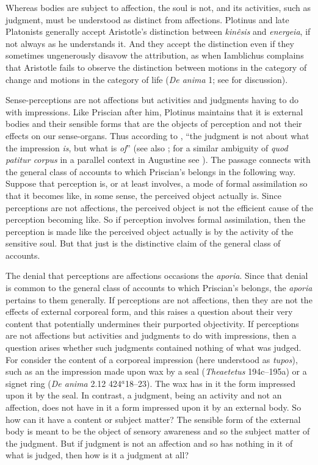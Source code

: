 \documentclass[12pt]{article}
\begin{document}
Whereas bodies are subject to affection, the soul is not, and its activities, such as judgment, must be understood as distinct from affections. Plotinus and late Platonists generally accept Aristotle's distinction between \emph{kinêsis} and \emph{energeia}, if not always as he understands it. And they accept the distinction even if they sometimes ungenerously disavow the attribution, as when Iamblichus complains that Aristotle fails to observe the distinction between motions in the category of change and motions in the category of life (\emph{De anima} 1; see \citealt[76--77]{Finamore:2002yf} for discussion). 

Sense-perceptions are not affections but activities and judgments having to do with impressions. Like Priscian after him, Plotinus maintains that it is external bodies and their sensible forms that are the objects of perception and not their effects on our sense-organs. Thus according to \citet[73]{Fleet:1995gf}, ``the judgment is not about what the impression \emph{is}, but what is \emph{of}'' (see also \citealt[75 n.28]{Emilsson:1988uq}; for a similar ambiguity of \emph{quod patitur corpus} in a parallel context in Augustine see \citealt{Brittain:2002hl}). The passage connects with the general class of accounts to which Priscian's belongs in the following way. Suppose that perception is, or at least involves, a mode of formal assimilation so that it becomes like, in some sense, the perceived object actually is. Since perceptions are not affections, the perceived object is not the efficient cause of the perception becoming like. So if perception involves formal assimilation, then the perception is made like the perceived object actually is by the activity of the sensitive soul. But that just is the distinctive claim of the general class of accounts.

The denial that perceptions are affections occasions the \emph{aporia}. Since that denial is common to the general class of accounts to which Priscian's belongs, the \emph{aporia} pertains to them generally. If perceptions are not affections, then they are not the effects of external corporeal form, and this raises a question about their very content that potentially undermines their purported objectivity. If perceptions are not affections but activities and judgments to do with impressions, then a question arises whether such judgments contained nothing of what was judged. For consider the content of a corporeal impression (here understood as \emph{tupos}), such as an the impression made upon wax by a seal (\emph{Theaetetus} 194c--195a) or a signet ring (\emph{De anima} 2.12 424\( ^{a} \)18--23). The wax has in it the form impressed upon it by the seal. In contrast, a judgment, being an activity and not an affection, does not have in it a form impressed upon it by an external body. So how can it have a content or subject matter? The sensible form of the external body is meant to be the object of sensory awareness and so the subject matter of the judgment. But if judgment is not an affection and so has nothing in it of what is judged, then how is it a judgment at all?
\end{document}
